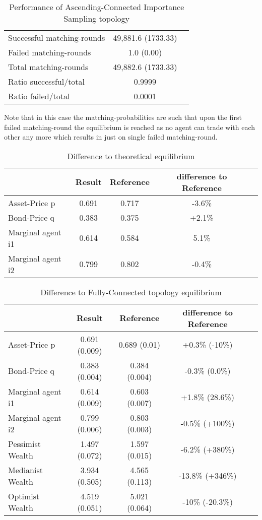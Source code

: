 \documentclass[Bachelorarbeit.tex]{subfiles}
\begin{document}
\begin{table}[H]
	\caption{Performance of Ascending-Connected Importance Sampling topology}
	\centering
	\begin{tabular} { l c r }
		\hline
		Successful matching-rounds & 49,881.6 (1733.33) \\
		Failed matching-rounds & 1.0 (0.00) \\
		Total matching-rounds & 49,882.6 (1733.33) \\
		\hline
		Ratio successful/total & 0.9999 \\
		Ratio failed/total & 0.0001 \\
		\hline
	\end{tabular}
\end{table}

Note that in this case the matching-probabilities are such that upon the first failed matching-round the equilibrium is reached as no agent can trade with each other any more which results in just on single failed matching-round.

\begin{table}[H]
	\caption{Difference to theoretical equilibrium}
	\centering
	\begin{tabular} { l c c c r }
		& Result & Reference & difference to Reference \\
		\hline
		Asset-Price p & 0.691 & 0.717 & -3.6\% \\
		Bond-Price q & 0.383 & 0.375 & +2.1\% \\
		Marginal agent i1 & 0.614 & 0.584 & 5.1\% \\
		Marginal agent i2 & 0.799 & 0.802 & -0.4\% \\
		\hline
	\end{tabular}
\end{table}

\begin{table}[H]
	\caption{Difference to Fully-Connected topology equilibrium}
	\centering
	\begin{tabular} { l c c c r }
		& Result & Reference & difference to Reference \\
		\hline
		Asset-Price p & 0.691 (0.009) & 0.689 (0.01) & +0.3\% (-10\%) \\
		Bond-Price q & 0.383 (0.004) & 0.384 (0.004) & -0.3\% (0.0\%) \\
		Marginal agent i1 & 0.614 (0.009) & 0.603 (0.007) & +1.8\% (28.6\%) \\
		Marginal agent i2 & 0.799 (0.006) & 0.803 (0.003) & -0.5\% (+100\%) \\
		\hline
		Pessimist Wealth & 1.497 (0.072) & 1.597 (0.015) & -6.2\% (+380\%) \\
		Medianist Wealth & 3.934 (0.505) & 4.565 (0.113) & -13.8\% (+346\%) \\
		Optimist Wealth & 4.519 (0.051) & 5.021 (0.064) & -10\% (-20.3\%) \\
		\hline
	\end{tabular}
\end{table}
\end{document}
